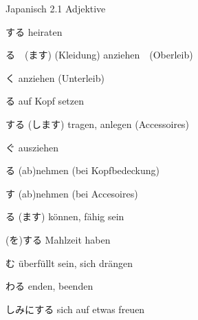 \begin{multicols*}{2}
\begin{flushleft}
\begin{labeling}{Japanisch 2.1 Adjektive}
	\item [\ruby{結婚}{けっこん}する] heiraten
	\item [\ruby{着}{き}る　(\ruby{着}{き}ます)] (Kleidung) anziehen　(Oberleib)
	\item [\ruby{履}{は}く] anziehen (Unterleib)
	\item [\ruby{被}{かぶ}る] auf Kopf setzen
	\item [する (します)] tragen, anlegen (Accessoires)
	\item [\ruby{脱}{ぬ}ぐ] ausziehen
	\item [\ruby{取}{と}る] (ab)nehmen (bei Kopfbedeckung)
	\item [\ruby{外}{はず}す] (ab)nehmen (bei Accesoires)
	
	\item [\ruby{出来}{でき}る (\ruby{出来}{でき}ます)] können, fähig sein
	
	\item [\ruby{食事}{しょくじ}(を)する] Mahlzeit haben
	
	\item [\ruby{込}{こ}む] überfüllt sein, sich drängen
	\item [\ruby{終}{お}わる] enden, beenden
	\item [\ruby{楽}{たの}しみにする] sich auf etwas freuen
	
\end{labeling}
\end{flushleft}
\end{multicols*}
\clearpage
